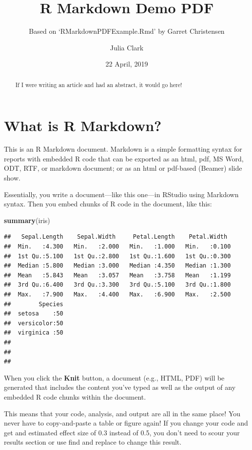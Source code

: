 \documentclass[11pt,]{article}
\title{R Markdown Demo PDF}
\subtitle{Based on `RMarkdownPDFExample.Rmd' by Garret Christensen}
\author{Julia Clark}
\date{22 April, 2019}
\newenvironment{Shaded}{\begin{snugshade}}{\end{snugshade}}
\newcommand{\KeywordTok}[1]{\textcolor[rgb]{0.13,0.29,0.53}{\textbf{#1}}}
\newcommand{\NormalTok}[1]{#1}
\begin{document}
\maketitle
\begin{abstract}
If I were writing an article and had an abstract, it would go here!
\end{abstract}

\hypertarget{what-is-r-markdown}{%
\section{What is R Markdown?}\label{what-is-r-markdown}}

This is an R Markdown document. Markdown is a simple formatting syntax
for reports with embedded R code that can be exported as an html, pdf,
MS Word, ODT, RTF, or markdown document; or as an html or pdf-based
(Beamer) slide show.

Essentially, you write a document---like this one---in RStudio using
Markdown syntax. Then you embed chunks of R code in the document, like
this:

\begin{Shaded}
\begin{Highlighting}[]
\KeywordTok{summary}\NormalTok{(iris)}
\end{Highlighting}
\end{Shaded}

\begin{verbatim}
##   Sepal.Length    Sepal.Width     Petal.Length    Petal.Width   
##  Min.   :4.300   Min.   :2.000   Min.   :1.000   Min.   :0.100  
##  1st Qu.:5.100   1st Qu.:2.800   1st Qu.:1.600   1st Qu.:0.300  
##  Median :5.800   Median :3.000   Median :4.350   Median :1.300  
##  Mean   :5.843   Mean   :3.057   Mean   :3.758   Mean   :1.199  
##  3rd Qu.:6.400   3rd Qu.:3.300   3rd Qu.:5.100   3rd Qu.:1.800  
##  Max.   :7.900   Max.   :4.400   Max.   :6.900   Max.   :2.500  
##        Species  
##  setosa    :50  
##  versicolor:50  
##  virginica :50  
##                 
##                 
## 
\end{verbatim}

When you click the \textbf{Knit} button, a document (e.g., HTML, PDF)
will be generated that includes the content you've typed as well as the
output of any embedded R code chunks within the document.

This means that your code, analysis, and output are all in the same
place! You never have to copy-and-paste a table or figure again! If you
change your code and get and estimated effect size of 0.3 instead of
0.5, you don't need to scour your results section or use find and
replace to change this result.
\end{document}
